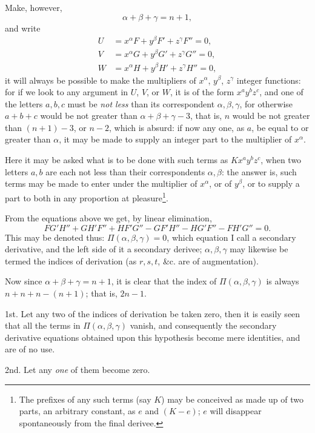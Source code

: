 \documentclass[11pt]{article}
\newcommand{\sourcepage}[1]{\marginpar{\scriptsize p.~#1}}
\begin{document}
Make, however,
\[
 \alpha+\beta+\gamma=n+1,
\]
and write
\[
\begin{aligned}
 U&=x^\alpha F+y^\beta F'+z^\gamma F''=0,\\
 V&=x^\alpha G+y^\beta G'+z^\gamma G''=0,\\
 W&=x^\alpha H+y^\beta H'+z^\gamma H''=0,
\end{aligned}
\]
it will always be possible to make the multipliers of $x^\alpha$, $y^\beta$, $z^\gamma$ integer functions: for if we look to any argument in $U$, $V$, or $W$, it is of the form $x^a y^b z^c$, and one of the letters $a,b,c$ must be \emph{not less} than its correspondent $\alpha,\beta,\gamma$, for otherwise $a+b+c$ would be not greater than $\alpha+\beta+\gamma-3$, that is, $n$ would be not greater than $(n+1)-3$, or $n-2$, which is absurd: if now any one, as $a$, be equal to or greater than $\alpha$, it may be made to supply an integer part to the multiplier of $x^\alpha$.

Here it may be asked what is to be done with such terms as $Kx^a y^b z^c$, when two letters $a,b$ are each not less than their correspondents $\alpha,\beta$: the answer is, such terms may be made to enter under the multiplier of $x^\alpha$, or of $y^\beta$, or to supply a part to both in any proportion at pleasure\footnote{The prefixes of any such terms (say $K$) may be conceived as made up of two parts, an arbitrary constant, as $e$ and $(K-e)$; $e$ will disappear spontaneously from the final derivee.}.

From the equations above we get, by linear elimination,
\[
 FG'H''+GH'F''+HF'G''-GF'H''-HG'F''-FH'G''=0.
\]
This may be denoted thus: $\Pi(\alpha,\beta,\gamma)=0$, which equation I call a secondary derivative, and the left side of it a secondary derivee; $\alpha,\beta,\gamma$ may likewise be termed the indices of derivation (as $r,s,t$, \&c. are of augmentation).

Now since $\alpha+\beta+\gamma=n+1$, it is clear that the index of $\Pi(\alpha,\beta,\gamma)$ is always $n+n+n-(n+1)$; that is, $2n-1$.

\sourcepage{78}
1st. Let any two of the indices of derivation be taken zero, then it is easily seen that all the terms in $\Pi(\alpha,\beta,\gamma)$ vanish, and consequently the secondary derivative equations obtained upon this hypothesis become mere identities, and are of no use.

2nd. Let any \emph{one} of them become zero.
\end{document}
